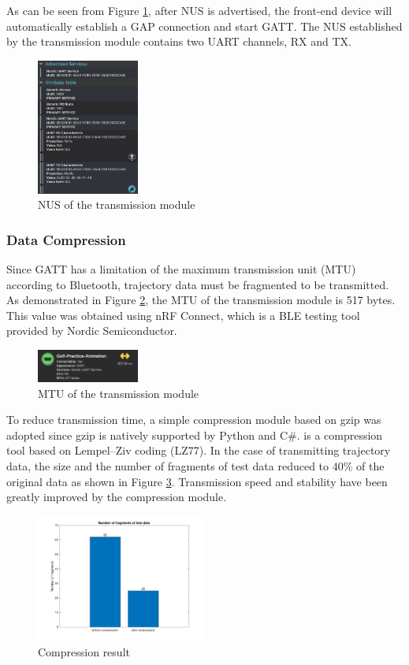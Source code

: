 As can be seen from Figure \ref{fig:nus}, after NUS is advertised, the front-end device will automatically establish a GAP connection and start GATT. The NUS established by the transmission module contains two UART channels, RX and TX.
\begin{figure}[H]
    \centering
    \includegraphics[width=0.3\textwidth]{figure/nus.png}
    \caption{NUS of the transmission module}
    \label{fig:nus}
\end{figure}

\subsubsection{Data Compression}
Since GATT has a limitation of the maximum transmission unit (MTU) according to Bluetooth, trajectory data must be fragmented to be transmitted. As demonstrated in Figure \ref{fig:mtu}, the MTU of the transmission module is 517 bytes. This value was obtained using nRF Connect, which is a BLE testing tool provided by Nordic Semiconductor.
\begin{figure}[H]
    \centering
    \includegraphics[width=0.3\textwidth]{figure/mtu.png}
    \caption{MTU of the transmission module}
    \label{fig:mtu}
\end{figure}
To reduce transmission time, a simple compression module based on gzip was adopted since gzip is natively supported by Python and C\#. \textcite{gzip} is a compression tool based on Lempel–Ziv coding (LZ77). In the case of transmitting trajectory data, the size and the number of fragments of test data reduced to 40\% of the original data as shown in Figure \ref{fig:compress}. Transmission speed and stability have been greatly improved by the compression module.
\begin{figure}[H]
    \centering
    \includegraphics[width=0.5\textwidth]{figure/compression.pdf}
    \caption{Compression result}
    \label{fig:compress}
\end{figure}


